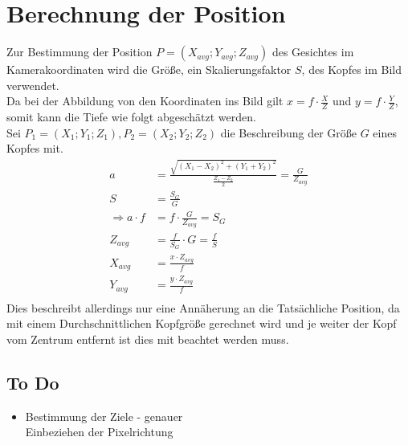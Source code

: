 \section{Berechnung der Position}
\label{calc_Position}
Zur Bestimmung der Position $P=(X_{avg};Y_{avg};Z_{avg})$ des Gesichtes im Kamerakoordinaten wird die Größe, ein Skalierungsfaktor $S$, des Kopfes im Bild verwendet.\\
Da bei der Abbildung von den Koordinaten ins Bild gilt $x=f\cdot \frac{X}{Z}$ und $ y=f\cdot \frac{Y}{Z}$, somit kann die Tiefe wie folgt abgeschätzt werden.\\
Sei $P_1 = (X_1;Y_1;Z_1), P_2=(X_2;Y_2;Z_2)$ die Beschreibung der Größe $G$ eines Kopfes mit.\\
\begin{align*}
a &= \frac{\sqrt{(X_1-X_2)^2+(Y_1+Y_2)^2}}{\frac{Z_1-Z_2}{2}} =\frac{G}{Z_{avg}}\\
S &= \frac{S_G}{G}\\
\Rightarrow a\cdot f &= f\cdot\frac{G}{Z_{avg}} = S_G\\
Z_{avg} &= \frac{f}{S_G}\cdot G = \frac{f}{S}\\
X_{avg} &= \frac{x \cdot Z_{avg}}{f}\\
Y_{avg} &= \frac{y \cdot Z_{avg}}{f}\\
\end{align*}
Dies beschreibt allerdings nur eine Annäherung an die Tatsächliche Position, da mit einem Durchschnittlichen Kopfgröße gerechnet wird und je weiter der Kopf vom Zentrum entfernt ist dies mit beachtet werden muss.
\subsection{To Do}
\begin{itemize}
\item Bestimmung der Ziele - genauer\\
Einbeziehen der Pixelrichtung
\end{itemize}